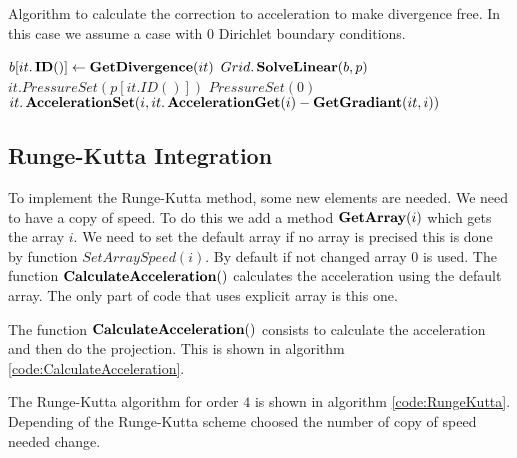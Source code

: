 \begin{algorithm}
\caption{Algorithm to calculate the correction to acceleration to make divergence free.
In this case we assume a case with 0 Dirichlet boundary conditions.}
\label{code:ProjectAcceleration}
\begin{algorithmic}[1]
				\State $b[it.\mathop{\textbf{ID}}()] \gets \mathop{\textbf{GetDivergence}}(it)$
			\EndIf
		\EndFor
		\State $Grid.\mathop{\textbf{SolveLinear}}(b,p)$
				\State $it.PressureSet(p[it.ID()])$
			\Else
				\State $PressureSet(0)$
			\EndIf
		\EndFor
				\State $it.\mathop{\textbf{AccelerationSet}}(i,it.\mathop{\textbf{AccelerationGet}}(i)-\mathop{\textbf{GetGradiant}}(it,i))$
			\EndFor
		\EndFor
\EndProcedure
			 \end{algorithmic}
\end{algorithm}

\subsection{Runge-Kutta Integration}
\label{fixed:sec:rungekutta}

To implement the Runge-Kutta method, some new elements are needed.
We need to have a copy of speed. To do this we add a method $\mathop{\textbf{GetArray}}(i)$ which gets the array $i$.
We need to set the default array if no array is precised this is done by function $SetArraySpeed(i)$.
By default if not changed array $0$ is used.
The function $\mathop{\textbf{CalculateAcceleration}}()$ calculates the acceleration using the default array.
The only part of code that uses explicit array is this one.

The function $\mathop{\textbf{CalculateAcceleration}}()$ consists to calculate the acceleration and then do the projection.
This is shown in algorithm \ref{code:CalculateAcceleration}.

The Runge-Kutta algorithm for order $4$ is shown in algorithm \ref{code:RungeKutta}.
Depending of the Runge-Kutta scheme choosed the number of copy of speed needed change.

